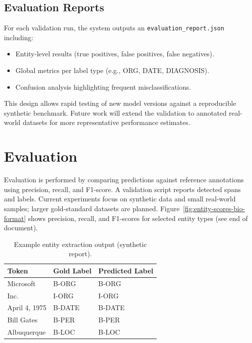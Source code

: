 \documentclass[conference]{IEEEtran}
\begin{document}
\subsection{Evaluation Reports}
{\raggedright For each validation run, the system outputs an \texttt{evaluation\_report.json} including: \par}
\begin{itemize}
    \item Entity-level results (true positives, false positives, false negatives).
    \item Global metrics per label type (e.g., ORG, DATE, DIAGNOSIS).
    \item Confusion analysis highlighting frequent misclassifications.
\end{itemize}

This design allows rapid testing of new model versions against a reproducible synthetic benchmark. 
Future work will extend the validation to annotated real-world datasets for more representative performance estimates.








\section{Evaluation}
Evaluation is performed by comparing predictions against reference annotations using precision, recall, and F1-score. A validation script reports detected spans and labels. Current experiments focus on synthetic data and small real-world samples; larger gold-standard datasets are planned.
Figure~\ref{fig:entity-scores-bio-format} shows precision, recall, and F1-scores for selected entity types (see end of document).

\begin{table}[htbp]
\centering
\caption{Example entity extraction output (synthetic report).}
\begin{tabular}{@{}p{2cm}p{2cm}p{2cm}@{}}
\toprule
\textbf{Token} & \textbf{Gold Label} & \textbf{Predicted Label} \\ \midrule
Microsoft      & B-ORG               & B-ORG \\
Inc.           & I-ORG               & I-ORG \\
April 4, 1975  & B-DATE              & B-DATE \\
Bill Gates     & B-PER               & B-PER \\
Albuquerque    & B-LOC               & B-LOC \\ \bottomrule
\end{tabular}
\label{tab:example}
\end{table}
\end{document}
